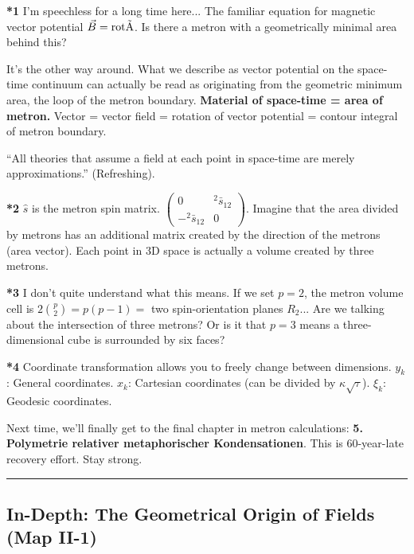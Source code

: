 \documentclass[11pt,a4paper,oneside]{article}
\newcommand{\hr}{\par\vspace{2em}\noindent\rule{\linewidth}{0.4pt}\par\vspace{2em}}
\begin{document}
\begin{reflectionbox}[title={Chat / Notes}]
    \textbf{*1} I'm speechless for a long time here... The familiar equation for magnetic vector potential $\vec{B}=\rm{rot}\vec{A}$. Is there a metron with a geometrically minimal area behind this?
    
    It's the other way around. What we describe as vector potential on the space-time continuum can actually be read as originating from the geometric minimum area, the loop of the metron boundary.
    \textbf{Material of space-time = area of metron.}
    Vector = vector field = rotation of vector potential = contour integral of metron boundary.
    
    ``All theories that assume a field at each point in space-time are merely approximations.'' (Refreshing).
    
    \textbf{*2} $\hat{s}$ is the metron spin matrix. $\begin{pmatrix} 0 & {}^2\bar{s}_{12} \\ -{}^2\bar{s}_{12} & 0 \end{pmatrix}$.
    Imagine that the area divided by metrons has an additional matrix created by the direction of the metrons (area vector). Each point in 3D space is actually a volume created by three metrons.
    
    \textbf{*3} I don't quite understand what this means. If we set $p=2$, the metron volume cell is $2\binom {p}{2}=p(p-1) = $ two spin-orientation planes $R_2$... Are we talking about the intersection of three metrons? Or is it that $p=3$ means a three-dimensional cube is surrounded by six faces?
    
    \textbf{*4} Coordinate transformation allows you to freely change between dimensions.
    $y_k$: General coordinates.
    $x_k$: Cartesian coordinates (can be divided by $\kappa\sqrt{\tau}$).
    $\xi_k$: Geodesic coordinates.
    
    Next time, we'll finally get to the final chapter in metron calculations: \textbf{5. Polymetrie relativer metaphorischer Kondensationen}.
    This is 60-year-late recovery effort. Stay strong.
\end{reflectionbox}

\hr

\subsection*{In-Depth: The Geometrical Origin of Fields (Map II-1)}
\end{document}
